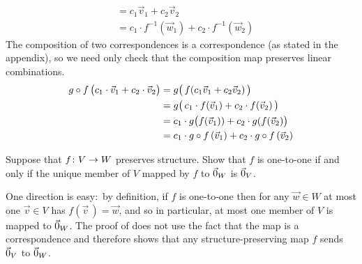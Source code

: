 \begin{exercises}
\begin{answer}
\begin{exparts}
\begin{align*}
              &=c_1\vec{v}_1+c_2\vec{v}_2                             \\ 
              &=c_1\cdot f^{-1}(\vec{w}_1)+c_2\cdot f^{-1}(\vec{w}_2)    
          \end{align*}
        \partsitem The composition of two correspondences is a correspondence
          (as stated in the appendix), so we need only check that the 
          composition map preserves linear combinations.
          \begin{align*}
           g\mathbin\circ f\,\bigl(c_1\cdot\vec{v}_1+c_2\cdot\vec{v}_2\bigr)
             &=g\bigl(\,f(c_1\vec{v}_1+c_2\vec{v}_2)\,\bigr)        \\
             &=g\bigl(\,c_1\cdot f(\vec{v}_1)+c_2\cdot f(\vec{v}_2)\,\bigr) \\ 
             &=c_1\cdot g\bigl(f(\vec{v}_1))+c_2\cdot g(f(\vec{v}_2)\bigr)  \\
             &=c_1\cdot g\mathbin\circ f\,(\vec{v}_1)
                  +c_2\cdot g\mathbin\circ f\,(\vec{v}_2)
          \end{align*}
      \end{exparts}
     \end{answer}
  \item 
    Suppose that \( \mbox{$f\colon V\to W$} \) preserves structure.
    Show that \( f \) is one-to-one if and only if the unique member of 
    \( V \) mapped by \( f \) to \( \vec{0}_W \) is \( \vec{0}_V \).
    \begin{answer}
      One direction is easy:~by definition, if \( f \) is one-to-one 
      then for any
      \( \vec{w}\in W \) at most one \( \vec{v}\in V \) has
      \( f(\vec{v}\,)=\vec{w} \), and so in particular, at most one member of
      \( V \) is mapped to \( \vec{0}_W \).
      The proof of  does not use the
      fact that the map is a correspondence and therefore 
      shows that any structure-preserving map 
      \( f \) sends \( \vec{0}_V \) to \( \vec{0}_W \).


\end{answer}
\end{exercises}
